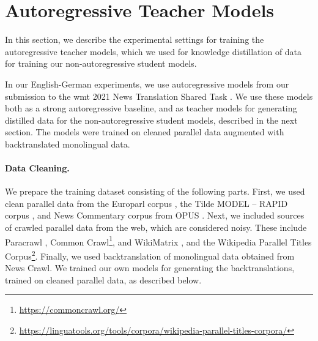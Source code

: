 \section{Autoregressive Teacher Models}%
\label{sec:exp:teachers}


\noindent
In this section, we describe the experimental settings for training the
autoregressive teacher models, which we used for knowledge distillation of data
for training our non-autoregressive student models.

In our English-German experiments, we use autoregressive models from our
submission to the \ac{wmt} 2021 News Translation Shared Task
\citep{chen-etal-2021-university}. We use these models both as a strong
autoregressive baseline, and as teacher models for generating distilled data
for the non-autoregressive student models, described in the next section.  The
models were trained on cleaned parallel data augmented with backtranslated
monolingual data.

\paragraph{Data Cleaning.} We prepare the training dataset consisting of the
following parts. First, we used clean parallel data from the Europarl corpus
\citep{koehn-2005-europarl}, the Tilde MODEL -- RAPID corpus
\citep{rozis-skadins-2017-tilde}, and News Commentary corpus from OPUS
\citep{tiedemann-2012-parallel}. Next, we included sources of crawled parallel
data from the web, which are considered noisy. These include Paracrawl
\citep{espla-etal-2019-paracrawl}, Common
Crawl\footnote{\url{https://commoncrawl.org/}}, and WikiMatrix
\citep{schwenk2019wikimatrix}, and the Wikipedia Parallel Titles
Corpus\footnote{\url{https://linguatools.org/tools/corpora/wikipedia-parallel-titles-corpora/}}. Finally,
we used backtranslation \citep{sennrich-etal-2016-improving} of monolingual
data obtained from News Crawl. We trained our own models for generating the
backtranslations, trained on cleaned parallel data, as described below.

